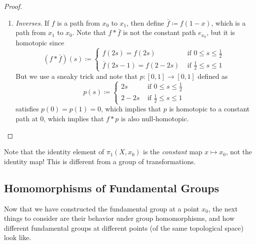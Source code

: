 \begin{proof}
\begin{enumerate}
      \item \textit{Inverses}. If $f$ is a path from $x_0$ to $x_1$, then define $\bar{f} \coloneqq f(1 - x)$, which is a path from $x_1$  to $x_0$. Note that $f \ast \bar{f}$ is not the constant path $e_{x_0}$, but it is homotopic since 
        \begin{equation}
          (f \ast \bar{f}) (s) \coloneqq \begin{cases} 
            f(2s) = f(2s) & \text{ if } 0 \leq s \leq \frac{1}{2} \\ 
            \bar{f}(2s - 1) = f(2 - 2s) & \text{ if } \frac{1}{2} \leq s \leq 1
          \end{cases}
        \end{equation}
        But we use a sneaky trick and note that $p: [0, 1] \to [0, 1]$ defined as 
        \begin{equation}
          p(s) \coloneqq \begin{cases} 
            2s & \text{ if } 0 \leq s \leq \frac{1}{2} \\ 
            2 - 2s & \text{ if } \frac{1}{2} \leq s \leq 1
          \end{cases}
        \end{equation}
        satisfies $p(0) = p(1) = 0$, which implies that $p$ is homotopic to a constant path at $0$, which implies that $f \ast p$ is also null-homotopic. 
    \end{enumerate}
  \end{proof}

  Note that the identity element of $\pi_1 (X, x_0)$ is the \textit{constant} map $x \mapsto x_0$, not the identity map! This is different from a group of transformations. 

\subsection{Homomorphisms of Fundamental Groups}

  Now that we have constructed the fundamental group at a point $x_0$, the next things to consider are their behavior under group homomorphisms, and how different fundamental groups at different points (of the same topological space) look like. 

